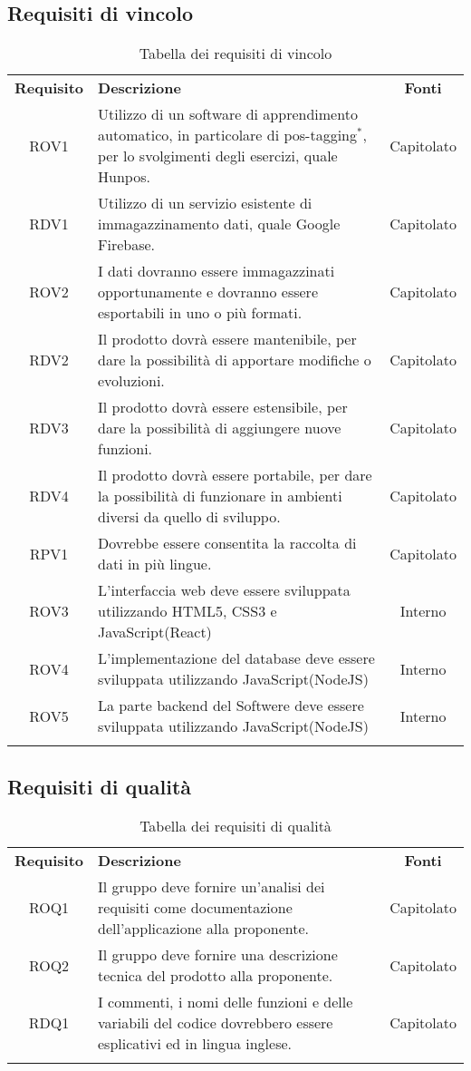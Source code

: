 \subsection{Requisiti di vincolo}
\begin{longtable}{| c | p{10cm} | c |}
		\rowcolor{LightBlue}
		\color{white}\bfseries Requisito & \color{white}\bfseries Descrizione & \color{white}\bfseries Fonti\\[0.25cm]
		ROV1 & Utilizzo di un software di apprendimento automatico, in particolare di pos-tagging$^*$, per lo svolgimenti degli esercizi, quale Hunpos. & Capitolato \\
		RDV1 & Utilizzo di un servizio esistente di immagazzinamento dati, quale Google Firebase. & Capitolato \\
		ROV2 & I dati dovranno essere immagazzinati opportunamente e dovranno essere esportabili in uno o più formati. & Capitolato \\
		RDV2 & Il prodotto dovrà essere mantenibile, per dare la possibilità di apportare modifiche o evoluzioni. & Capitolato \\
		RDV3 & Il prodotto dovrà essere estensibile, per dare la possibilità di aggiungere nuove funzioni. & Capitolato \\
		RDV4 & Il prodotto dovrà essere  portabile, per dare la possibilità di funzionare in ambienti diversi da quello di sviluppo. & Capitolato \\
		RPV1 & Dovrebbe essere consentita la raccolta di dati in più lingue. & Capitolato \\ 
		ROV3 & L’interfaccia web deve essere sviluppata utilizzando HTML5, CSS3 e JavaScript(React) & Interno\\
		ROV4 & L'implementazione del database deve essere sviluppata utilizzando JavaScript(NodeJS) & Interno\\
		ROV5 & La parte backend del Softwere deve essere sviluppata utilizzando JavaScript(NodeJS) & Interno\\		
		\hline
		\caption{Tabella dei requisiti di vincolo}
\end{longtable}

\subsection{Requisiti di qualità}
\begin{longtable}{| c | p{10cm} | c |}
		\rowcolor{LightBlue}
		\color{white}\bfseries Requisito & \color{white}\bfseries Descrizione & \color{white}\bfseries Fonti\\[0.25cm]
		ROQ1 & Il gruppo deve fornire un'analisi dei requisiti come documentazione dell'applicazione alla proponente. & Capitolato \\
		ROQ2 & Il gruppo deve fornire una descrizione tecnica del prodotto alla proponente. & Capitolato \\ 
		RDQ1 & I commenti, i nomi delle funzioni e delle variabili del codice dovrebbero essere esplicativi ed in lingua inglese. & Capitolato \\ 
		\hline
		\caption{Tabella dei requisiti di qualità}
\end{longtable}